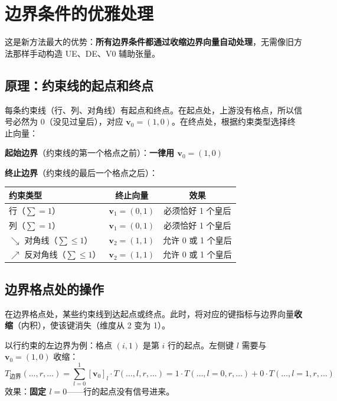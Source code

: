\documentclass[12pt,a4paper]{article}
\begin{document}
\section{边界条件的优雅处理}

这是新方法最大的优势：\textbf{所有边界条件都通过收缩边界向量自动处理}，无需像旧方法那样手动构造 UE、DE、V0 辅助张量。

\subsection{原理：约束线的起点和终点}

每条约束线（行、列、对角线）有起点和终点。在起点处，上游没有格点，所以信号必然为 0（没见过皇后），对应 $\mathbf{v}_0 = (1, 0)$。在终点处，根据约束类型选择终止向量：

\begin{keybox}[边界向量的选择规则]
\textbf{起始边界}（约束线的第一个格点之前）：\textbf{一律用 $\mathbf{v}_0 = (1, 0)$}

\medskip
\textbf{终止边界}（约束线的最后一个格点之后）：
\begin{center}
\renewcommand{\arraystretch}{1.3}
\begin{tabular}{lcc}
\toprule
约束类型 & 终止向量 & 效果 \\
\midrule
行（$\sum = 1$） & $\mathbf{v}_1 = (0, 1)$ & 必须恰好 1 个皇后 \\
列（$\sum = 1$） & $\mathbf{v}_1 = (0, 1)$ & 必须恰好 1 个皇后 \\
$\searrow$ 对角线（$\sum \leq 1$） & $\mathbf{v}_2 = (1, 1)$ & 允许 0 或 1 个皇后 \\
$\nearrow$ 反对角线（$\sum \leq 1$） & $\mathbf{v}_2 = (1, 1)$ & 允许 0 或 1 个皇后 \\
\bottomrule
\end{tabular}
\end{center}
\end{keybox}

\subsection{边界格点处的操作}

在边界格点处，某些约束线到达起点或终点。此时，将对应的键指标与边界向量\textbf{收缩}（内积），使该键消失（维度从 2 变为 1）。

\begin{exbox}[收缩的含义]
以行约束的左边界为例：格点 $(i, 1)$ 是第 $i$ 行的起点。左侧键 $l$ 需要与 $\mathbf{v}_0 = (1, 0)$ 收缩：
\[
T_{\text{边界}}(\ldots, r, \ldots) = \sum_{l=0}^{1} [\mathbf{v}_0]_l \cdot T(\ldots, l, r, \ldots) = 1 \cdot T(\ldots, l{=}0, r, \ldots) + 0 \cdot T(\ldots, l{=}1, r, \ldots)
\]
效果：\textbf{固定 $l = 0$}——行的起点没有信号进来。
\end{exbox}
\end{document}
